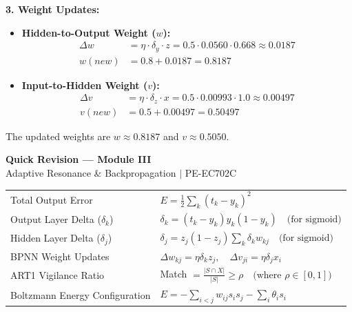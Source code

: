 \documentclass[12pt,a4paper]{article}
\renewcommand{\arraystretch}{1.45}
\begin{document}
\begin{tcolorbox}[examplebox, title={Backpropagation Step-by-Step Numerical}]
\par\vspace{4pt}
\textbf{3. Weight Updates:}
\begin{itemize}[leftmargin=*, itemsep=2.5pt]
  \item \textbf{Hidden-to-Output Weight ($w$):}
    \begin{align*}
      \Delta w &= \eta \cdot \delta_y \cdot z = 0.5 \cdot 0.0560 \cdot 0.668 \approx 0.0187 \\
      w(new) &= 0.8 + 0.0187 = 0.8187
    \end{align*}
  \item \textbf{Input-to-Hidden Weight ($v$):}
    \begin{align*}
      \Delta v &= \eta \cdot \delta_z \cdot x = 0.5 \cdot 0.00993 \cdot 1.0 \approx 0.00497 \\
      v(new) &= 0.5 + 0.00497 = 0.50497
    \end{align*}
\end{itemize}
The updated weights are $w \approx 0.8187$ and $v \approx 0.5050$.
\end{tcolorbox}

\newpage

\begin{center}
  {\large\bfseries\color{myred} Quick Revision --- Module III}\\[3pt]
  {\small\color{mydark} Adaptive Resonance \& Backpropagation $|$ PE-EC702C}
\end{center}
\noindent{\color{myred}\rule{\linewidth}{1.2pt}}
\vspace{4pt}

\begin{tcolorbox}[formulabox, title={\textbf{Key Formulas at a Glance}}]
\renewcommand{\arraystretch}{1.3}
\begin{tabularx}{\linewidth}{B{5.0cm} X}Total Output Error & $E = \frac{1}{2} \sum_{k} (t_k - y_k)^2$ \\
Output Layer Delta ($\delta_k$) & $\delta_k = (t_k - y_k) y_k (1 - y_k) \quad \text{(for sigmoid)}$ \\
Hidden Layer Delta ($\delta_j$) & $\delta_j = z_j(1 - z_j) \sum_{k} \delta_k w_{kj} \quad \text{(for sigmoid)}$ \\
BPNN Weight Updates & $\Delta w_{kj} = \eta \delta_k z_j, \quad \Delta v_{ji} = \eta \delta_j x_i$ \\
ART1 Vigilance Ratio & Match $= \frac{|S \cap X|}{|S|} \ge \rho \quad \text{(where } \rho \in [0, 1]\text{)}$ \\
Boltzmann Energy Configuration & $E = -\sum_{i < j} w_{ij} s_i s_j - \sum_i \theta_i s_i$
\end{tabularx}
\end{tcolorbox}
\end{document}
